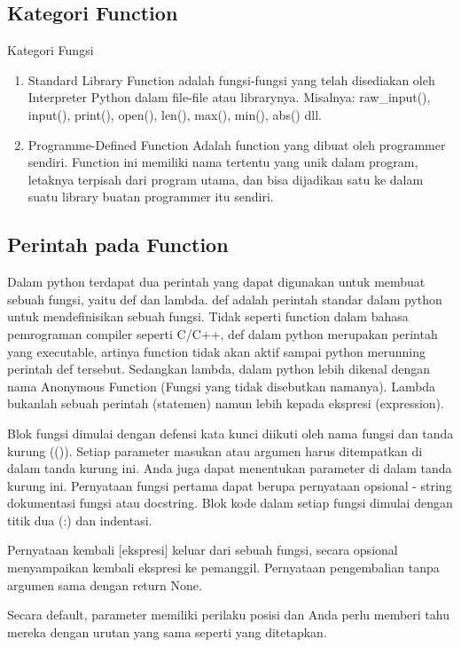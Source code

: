\subsection{Kategori Function}
Kategori Fungsi
\begin{enumerate}
\item
Standard Library Function
adalah fungsi-fungsi yang telah disediakan oleh Interpreter Python dalam file-file atau librarynya.
 Misalnya: raw\_input(), input(), print(), open(), len(), max(), min(), abs() dll.
\item
Programme-Defined Function
Adalah function yang dibuat oleh programmer sendiri. Function ini memiliki nama tertentu yang
unik dalam program, letaknya terpisah dari program utama, dan bisa dijadikan satu ke dalam suatu
library buatan programmer itu sendiri.
\end{enumerate}

\subsection{Perintah pada Function}
Dalam python terdapat dua perintah yang dapat digunakan untuk membuat sebuah fungsi,
yaitu def dan lambda. def adalah perintah standar dalam python untuk mendefinisikan sebuah
fungsi. Tidak seperti function dalam bahasa pemrograman compiler seperti C/C++, def dalam
python merupakan perintah yang executable, artinya function tidak akan aktif sampai python merunning
perintah def tersebut. Sedangkan lambda, dalam python lebih dikenal dengan nama
Anonymous Function (Fungsi yang tidak disebutkan namanya). Lambda bukanlah sebuah perintah
(statemen) namun lebih kepada ekspresi (expression).

Blok fungsi dimulai dengan defensi kata kunci diikuti oleh nama fungsi dan tanda kurung (()). 
Setiap parameter masukan atau argumen harus ditempatkan di dalam tanda kurung ini. Anda juga dapat menentukan parameter di dalam tanda kurung ini. 
Pernyataan fungsi pertama dapat berupa pernyataan opsional - string dokumentasi fungsi atau docstring. 
Blok kode dalam setiap fungsi dimulai dengan titik dua (:) dan indentasi. 

Pernyataan kembali [ekspresi] keluar dari sebuah fungsi, secara opsional menyampaikan kembali ekspresi ke pemanggil. Pernyataan pengembalian tanpa argumen sama dengan return None.

Secara default, parameter memiliki perilaku posisi dan Anda perlu memberi tahu mereka dengan urutan yang sama seperti yang ditetapkan.

